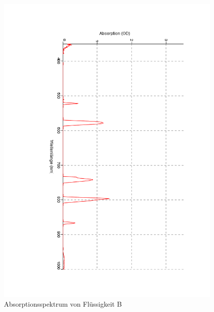 \documentclass[12pt,a4paper]{article}
\begin{document}
\begin{figure}[H]
	\centering
	\includegraphics[scale=0.5,angle = 90,trim = 20mm 20mm 20mm 20mm]{./data/Spektro/Absorbtion_B_DO_4.pdf}
	\caption{Absorptionsspektrum von Flüssigkeit B}
	\label{fig:AbsorbtionB}
\end{figure}
\end{document}
